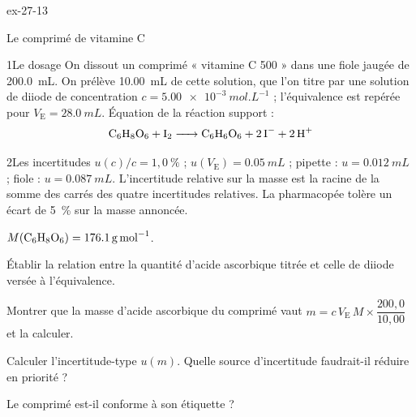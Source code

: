 \begin{blocLivre}{ex-27-13}
\begin{exercice}[3]{Le comprimé de vitamine C}
\begin{docu}{1}{Le dosage}
On dissout un comprimé « vitamine C 500 » dans une fiole jaugée de \qty{200,0}{mL}. On prélève \qty{10,00}{mL} de cette solution, que
l'on titre par une solution de diiode de concentration $c=\qty{5,00e-3}{mol.L^{-1}}$ ; l'équivalence est repérée pour
$V_\mathrm{E}=\qty{28,0}{mL}$. Équation de la réaction support :
\[\ce{C6H8O6 + I2 -> C6H6O6 + 2I- + 2H+}\]
\end{docu}
\begin{docu}{2}{Les incertitudes}
$u(c)/c=1{,}0~\%$ ; $u(V_\mathrm{E})=\qty{0,05}{mL}$ ; pipette : $u=\qty{0,012}{mL}$ ; fiole : $u=\qty{0,087}{mL}$. L'incertitude relative sur la
masse est la racine de la somme des carrés des quatre incertitudes relatives. La pharmacopée tolère un écart de
5~\% sur la masse annoncée.
\end{docu}
\begin{donnees}
$M(\ce{C6H8O6})=\qty{176,1}{g.mol^{-1}}$.
\end{donnees}
\begin{questions}
\item Établir la relation entre la quantité d'acide ascorbique titrée et celle de diiode versée à l'équivalence.
\item Montrer que la masse d'acide ascorbique du comprimé vaut $m=c\,V_\mathrm{E}\,M\times\dfrac{200{,}0}{10{,}00}$ et la calculer.
\item Calculer l'incertitude-type $u(m)$. Quelle source d'incertitude faudrait-il réduire en priorité ?
\item \initiative Le comprimé est-il conforme à son étiquette ?
\end{questions}
\end{exercice}
\end{blocLivre}
